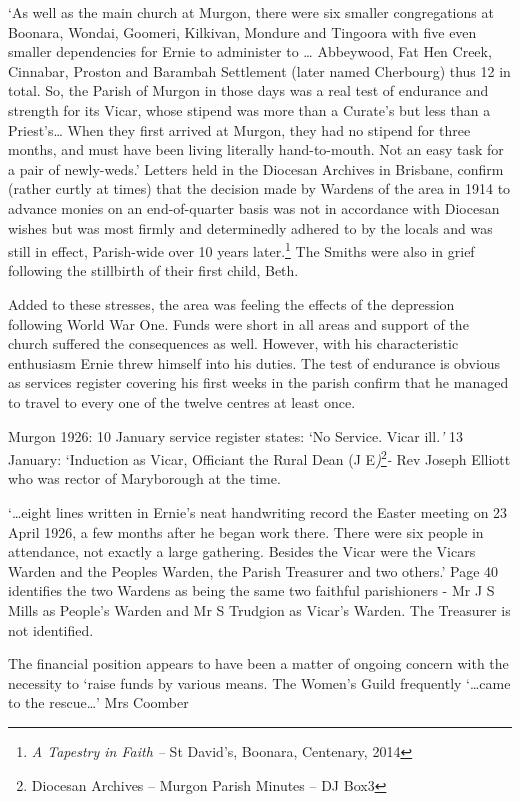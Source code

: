 `As well as the main church at Murgon, there were six smaller congregations at Boonara, Wondai, Goomeri, Kilkivan, Mondure and Tingoora with five even smaller dependencies for Ernie to administer to \ldots{} Abbeywood, Fat Hen Creek, Cinnabar, Proston and Barambah Settlement (later named Cherbourg) thus 12 in total. So, the Parish of Murgon in those days was a real test of endurance and strength for its Vicar, whose stipend was more than a Curate's but less than a Priest's\ldots{} When they first arrived at Murgon, they had no stipend for three months, and must have been living literally hand-to-mouth. Not an easy task for a pair of newly-weds.' Letters held in the Diocesan Archives in Brisbane, confirm (rather curtly at times) that the decision made by Wardens of the area in 1914 to advance monies on an end-of-quarter basis was not in accordance with Diocesan wishes but was most firmly and determinedly adhered to by the locals and was still in effect, Parish-wide over 10 years later.\footnote{\emph{A Tapestry in Faith --} St David's, Boonara, Centenary, 2014} The Smiths were also in grief following the stillbirth of their first child, Beth.

Added to these stresses, the area was feeling the effects of the depression following World War One. Funds were short in all areas and support of the church suffered the consequences as well. However, with his characteristic enthusiasm Ernie threw himself into his duties. The test of endurance is obvious as services register covering his first weeks in the parish confirm that he managed to travel to every one of the twelve centres at least once.

Murgon 1926: 10 January service register states: `No Service. Vicar ill.\emph{'} 13 January: `Induction as Vicar, Officiant the Rural Dean (J E\emph{)}\footnote{Diocesan Archives -- Murgon Parish Minutes -- DJ Box3}\emph{-} Rev Joseph Elliott who was rector of Maryborough at the time.

`\ldots eight lines written in Ernie's neat handwriting record the Easter meeting on 23 April 1926, a few months after he began work there. There were six people in attendance, not exactly a large gathering. Besides the Vicar were the Vicars Warden and the Peoples Warden, the Parish Treasurer and two others.' Page 40 identifies the two Wardens as being the same two faithful parishioners - Mr J S Mills as People's Warden and Mr S Trudgion as Vicar's Warden. The Treasurer is not identified.

The financial position appears to have been a matter of ongoing concern with the necessity to `raise funds by various means. The Women's Guild frequently `\ldots came to the rescue\ldots' Mrs Coomber

